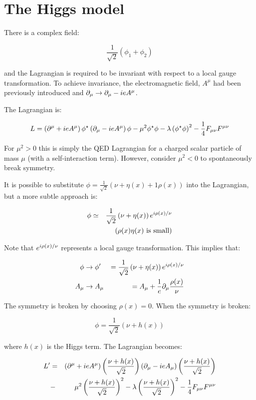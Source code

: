 \section{The Higgs model}

There is a complex field:

\[
  \frac{1}{\sqrt{2}}\left(\phi_1 + \phi_2\right)
\]

and the Lagrangian is required to be invariant with respect to a local gauge transformation.  To achieve invariance, the electromagnetic field, $A^{\mu}$ had been previously introduced and $\partial_{\mu} \to \partial_{\mu} - ie A^{\mu}$.

The Lagrangian is:

\[
  L = \left(\partial^{\mu} + ie A^{\mu}\right)\phi^{\star}\left(\partial_{\mu} - ie A^{\mu}\right)\phi - \mu^2 \phi^{\star}\phi - \lambda\left(\phi^{\star}\phi\right)^2 - \frac{1}{4}F_{\mu\nu}F^{\mu\nu}
\]

For $\mu^2>0$ this is simply the QED Lagrangian for a charged scalar particle of mass $\mu$ (with a self-interaction term).  However, consider $\mu^2<0$ to spontaneously break symmetry.

It is possible to substitute $\phi = \frac{1}{\sqrt{2}}\left(\nu + \eta(x) + 1\rho(x)\right)$ into the Lagrangian, but a more subtle approach is:

\begin{eqnarray*}
  \phi & \simeq & \frac{1}{\sqrt{2}}\left(\nu + \eta(x)\right) e^{i\rho(x)/\nu} \\
  & & \left( \rho(x)\eta(x) \textrm{ is small}\right)
\end{eqnarray*}

Note that $e^{i\rho(x)/\nu}$ represents a local gauge transformation.  This implies that:

\begin{eqnarray*}
  \phi & \to \phi' & = \frac{1}{\sqrt{2}}\left(\nu + \eta(x)\right) e^{i\rho(x)/\nu} \\
  A_{\mu} &\to A_{\mu} & = A_{\mu} + \frac{1}{e}\partial_{\mu} \frac{\rho(x)}{\nu}
\end{eqnarray*}

The symmetry is broken by choosing $\rho(x) = 0$.  When the symmetry is broken:

\[
  \phi = \frac{1}{\sqrt{2}}\left(\nu + h(x)\right)
\]

where $h(x)$ is the Higgs term.  The Lagrangian becomes:

\begin{eqnarray*}
  L' & = & \left(\partial^{\mu} + ie A^{\mu}\right)\left(\frac{\nu + h(x)}{\sqrt{2}}\right)\left(\partial_{\mu} - ie A_{\mu}\right)\left(\frac{\nu + h(x)}{\sqrt{2}}\right)\\
  & - & \mu^2\left(\frac{\nu + h(x)}{\sqrt{2}}\right)^2 - \lambda\left(\frac{\nu + h(x)}{\sqrt{2}}\right)^2 - \frac{1}{4}F_{\mu\nu}F^{\mu\nu}
\end{eqnarray*}

